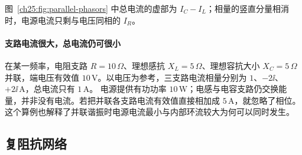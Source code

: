 \begin{center}
\label{ch25:fig:parallel-phasors}
\end{center}
图~\ref{ch25:fig:parallel-phasors} 中总电流的虚部为 $I_C-I_L$；相量的竖直分量相消时，电源电流只剩与电压同相的 $I_R$。


\paragraph{支路电流很大，总电流仍可很小}
在某一频率，电阻支路 $R=10\,\Omega$、理想感抗 $X_L=5\,\Omega$、理想容抗大小 $X_C=5\,\Omega$ 并联，端电压有效值 $10\,\mathrm V$。以电压为参考，三支路电流相量分别为
$1$、$-2\ii$、$+2\ii\,\mathrm A$，总电流只有 $1\,\mathrm A$。
电源提供有功功率 $10\,\mathrm W$；电感与电容支路仍交换能量，并非没有电流。若把并联各支路电流有效值直接相加成 $5\,\mathrm A$，就忽略了相位。
这个算例也解释了并联谐振时电源电流最小与内部环流较大为何可以同时发生。


\subsection{复阻抗网络}




